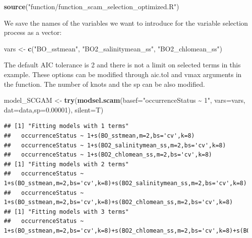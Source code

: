 \documentclass[
]{book}
\newenvironment{Shaded}{\begin{snugshade}}{\end{snugshade}}
\newcommand{\AttributeTok}[1]{\textcolor[rgb]{0.13,0.29,0.53}{#1}}
\newcommand{\FloatTok}[1]{\textcolor[rgb]{0.00,0.00,0.81}{#1}}
\newcommand{\FunctionTok}[1]{\textcolor[rgb]{0.13,0.29,0.53}{\textbf{#1}}}
\newcommand{\NormalTok}[1]{#1}
\newcommand{\OtherTok}[1]{\textcolor[rgb]{0.56,0.35,0.01}{#1}}
\newcommand{\StringTok}[1]{\textcolor[rgb]{0.31,0.60,0.02}{#1}}
\begin{document}
\begin{Shaded}
\begin{Highlighting}[]
\FunctionTok{source}\NormalTok{(}\StringTok{"function/function\_scam\_selection\_optimized.R"}\NormalTok{)}
\end{Highlighting}
\end{Shaded}

We save the names of the variables we want to introduce for the variable selection process as a vector:

\begin{Shaded}
\begin{Highlighting}[]
\NormalTok{vars }\OtherTok{\textless{}{-}} \FunctionTok{c}\NormalTok{(}\StringTok{"BO\_sstmean"}\NormalTok{,}
          \StringTok{"BO2\_salinitymean\_ss"}\NormalTok{,}
          \StringTok{"BO2\_chlomean\_ss"}\NormalTok{)}
\end{Highlighting}
\end{Shaded}

The default AIC tolerance is 2 and there is not a limit on selected terms in this example. These options can be modified through aic.tol and vmax arguments in the function. The number of knots and the sp can be also modified.

\begin{Shaded}
\begin{Highlighting}[]
\NormalTok{model\_SCGAM }\OtherTok{\textless{}{-}} \FunctionTok{try}\NormalTok{(}\FunctionTok{modsel.scam}\NormalTok{(}\AttributeTok{basef=}\StringTok{"occurrenceStatus \textasciitilde{} 1"}\NormalTok{, }\AttributeTok{vars=}\NormalTok{vars, }\AttributeTok{dat=}\NormalTok{data,}\AttributeTok{sp=}\FloatTok{0.00001}\NormalTok{), }\AttributeTok{silent=}\NormalTok{T)  }
\end{Highlighting}
\end{Shaded}

\begin{verbatim}
## [1] "Fitting models with 1 terms"
##   occurrenceStatus ~ 1+s(BO_sstmean,m=2,bs='cv',k=8) 
##   occurrenceStatus ~ 1+s(BO2_salinitymean_ss,m=2,bs='cv',k=8) 
##   occurrenceStatus ~ 1+s(BO2_chlomean_ss,m=2,bs='cv',k=8) 
## [1] "Fitting models with 2 terms"
##   occurrenceStatus ~ 1+s(BO_sstmean,m=2,bs='cv',k=8)+s(BO2_salinitymean_ss,m=2,bs='cv',k=8) 
##   occurrenceStatus ~ 1+s(BO_sstmean,m=2,bs='cv',k=8)+s(BO2_chlomean_ss,m=2,bs='cv',k=8) 
## [1] "Fitting models with 3 terms"
##   occurrenceStatus ~ 1+s(BO_sstmean,m=2,bs='cv',k=8)+s(BO2_chlomean_ss,m=2,bs='cv',k=8)+s(BO2_salinitymean_ss,m=2,bs='cv',k=8)
\end{verbatim}
\end{document}
